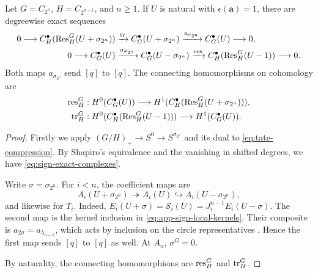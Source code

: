 \begin{proposition}\label{prop:sign-exact-complexes}
Let $G=C_{2^n}$, $H=C_{2^{n-1}}$, and $n\ge1$.
If $U$ is natural with $\epsilon(\mathbf a)=1$,
there are degreewise exact sequences
\begin{equation}\label{eq:sign-exact-complexes}
\begin{aligned}
0\longrightarrow C_H^\bullet(\operatorname{Res}_H^G(U+\sigma_{2^n}))
&\xrightarrow{\operatorname{tr}}C_G^\bullet(U+\sigma_{2^n})
\xrightarrow{a_{\sigma_{2^n}}}C_G^\bullet(U)\longrightarrow0,\\
0\longrightarrow C_G^\bullet(U)
&\xrightarrow{a_{\sigma_{2^n}}}C_G^\bullet(U-\sigma_{2^n})
\xrightarrow{\operatorname{res}}C_H^\bullet(\operatorname{Res}_H^G(U-1))\longrightarrow0.
\end{aligned}
\end{equation}
Both maps $a_{\sigma_{2^n}}$ send $[q]$ to $[q]$.
The connecting homomorphisms on cohomology are
\[
\begin{aligned}
\operatorname{res}_H^G&:H^0(C_G^\bullet(U))
\longrightarrow H^1(C_H^\bullet(\operatorname{Res}_H^G(U+\sigma_{2^n}))),\\
\operatorname{tr}_H^G&:H^0(C_H^\bullet(\operatorname{Res}_H^G(U-1)))
\longrightarrow H^1(C_G^\bullet(U)).
\end{aligned}
\]
\end{proposition}

\begin{proof}
Firstly we apply $(G/H)_+\to S^0\to S^{\sigma_{2^n}}$ and its dual to
\eqref{eq:tate-compression}. By Shapiro's equivalence and the vanishing
in shifted degrees, we have  \eqref{eq:sign-exact-complexes}.

Write $\sigma=\sigma_{2^n}$. For $i<n$, the coefficient maps are
\[
A_i(U+\sigma_{2^n})\twoheadrightarrow A_i(U)
\hookrightarrow A_i(U-\sigma_{2^n}),
\]
and likewise for $T_i$.
Indeed, $E_i(U+\sigma)=\mathcal S_i(U)=J_i^{n-1}E_i(U-\sigma)$.
The second map is the kernel inclusion in \eqref{eq:app-sign-local-kernels}.
Their composite is $a_{2\sigma}=a_{\lambda_{n-1}}$, which acts by inclusion
on the circle representatives \cite[Theorem~1.9 and Example~3.2]{SulymaNew}.
Hence the first map sends $[q]$ to $[q]$ as well. At $A_n$, $\sigma^G=0$.

By naturality,  the connecting homomorphisms are $\operatorname{res}_H^G$
and $\operatorname{tr}_H^G$.
\end{proof}

